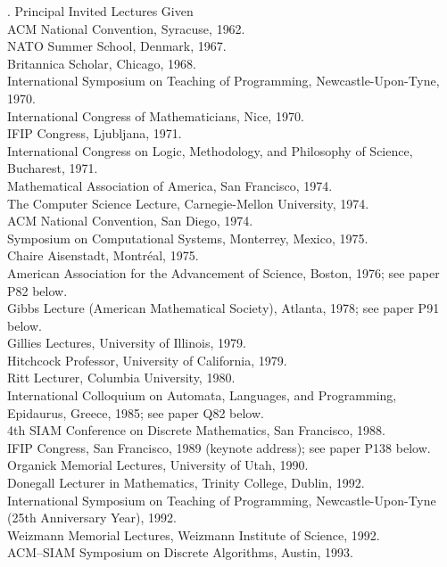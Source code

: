 . {Principal Invited Lectures Given}
\\ACM National Convention, Syracuse, 1962.
\\NATO Summer School, Denmark, 1967.
\\Britannica Scholar, Chicago, 1968.
\\International Symposium on Teaching of Programming, Newcastle-Upon-Tyne,
 1970.
\\International Congress of Mathematicians, Nice, 1970.
\\IFIP Congress, Ljubljana, 1971.
\\International Congress on Logic, Methodology, and Philosophy of Science,
Bucharest, 1971.
\\Mathematical Association of America, San Francisco, 1974.
\\The Computer Science Lecture, Carnegie-Mellon University, 1974.
\\ACM National Convention, San Diego, 1974.
\\Symposium on Computational Systems, Monterrey, Mexico, 1975.
\\Chaire Aisenstadt, Montr\'eal, 1975.
\\American Association for the Advancement of Science, Boston, 1976; see
 paper P82 below.
\\Gibbs Lecture (American Mathematical Society), Atlanta, 1978; see
 paper P91 below.
\\Gillies Lectures, University of Illinois, 1979.
\\Hitchcock Professor, University of California, 1979.   
\\Ritt Lecturer, Columbia University, 1980.  
\\International Colloquium on Automata, Languages, and Programming,
 Epidaurus, Greece, 1985; see paper Q82 below.
\\4th SIAM Conference on Discrete Mathematics, San Francisco, 1988.
\\IFIP Congress, San Francisco, 1989 (keynote address); see paper P138 below.
\\Organick Memorial Lectures, University of Utah, 1990.
\\Donegall Lecturer in Mathematics, Trinity College, Dublin, 1992.
\\International Symposium on Teaching of Programming, Newcastle-Upon-Tyne
 (25th Anniversary Year), 1992.
\\Weizmann Memorial Lectures, Weizmann Institute of Science, 1992.
\\ACM--SIAM Symposium on Discrete Algorithms, Austin, 1993.
